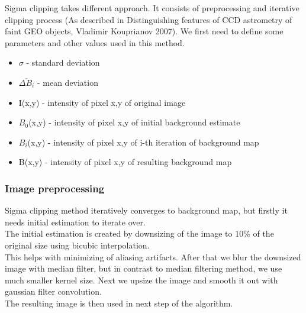 \documentclass[12pt, a4paper, oneside]{book}
\begin{document}
Sigma clipping takes different approach.
It consists of preprocessing and iterative clipping process (As described in Distinguishing features of CCD astrometry of faint GEO objects, Vladimir Kouprianov 2007).
We first need to define some parameters and other values used in this method.
\begin{itemize}
    \item{$\sigma$ - standard deviation}
    \item{$\overline{\Delta B_i}$ - mean deviation}
    \item{I(x,y) - intensity of pixel x,y of original image}
    \item{$B_0$(x,y) - intensity of pixel x,y of initial background estimate}
    \item{$B_i$(x,y) - intensity of pixel x,y of i-th iteration of background map}
    \item{B(x,y) - intensity of pixel x,y of resulting background map}
\end{itemize}

\subsubsection{Image preprocessing}
Sigma clipping method iteratively converges to background map, but firstly it needs initial estimation to iterate over.\\
The initial estimation is created by downsizing of the image to 10\% of the original size using bicubic interpolation.\\
This helps with minimizing of aliasing artifacts.
After that we blur the downsized image with median filter, but in contrast to median filtering method, we use much smaller kernel size.
Next we upsize the image and smooth it out with gaussian filter convolution.\\
The resulting image is then used in next step of the algorithm.
\end{document}
